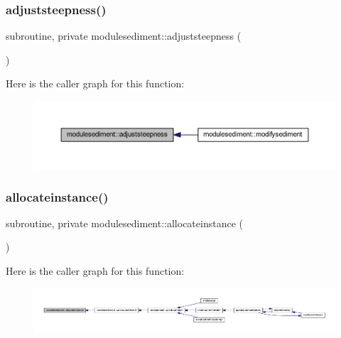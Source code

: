 \subsubsection{\texorpdfstring{adjuststeepness()}{adjuststeepness()}}
{\footnotesize\ttfamily subroutine, private modulesediment\+::adjuststeepness (\begin{DoxyParamCaption}{ }\end{DoxyParamCaption})\hspace{0.3cm}{\ttfamily [private]}}

Here is the caller graph for this function\+:\nopagebreak
\begin{figure}[H]
\begin{center}
\leavevmode
\includegraphics[width=350pt]{namespacemodulesediment_aa82529eb8b689ee3ddf738441376e275_icgraph}
\end{center}
\end{figure}
\mbox{\label{namespacemodulesediment_a7cf40ca051d012f054efecd59d7ffb97}} 
\subsubsection{\texorpdfstring{allocateinstance()}{allocateinstance()}}
{\footnotesize\ttfamily subroutine, private modulesediment\+::allocateinstance (\begin{DoxyParamCaption}{ }\end{DoxyParamCaption})\hspace{0.3cm}{\ttfamily [private]}}

Here is the caller graph for this function\+:\nopagebreak
\begin{figure}[H]
\begin{center}
\leavevmode
\includegraphics[width=350pt]{namespacemodulesediment_a7cf40ca051d012f054efecd59d7ffb97_icgraph}
\end{center}
\end{figure}
\mbox{\label{namespacemodulesediment_a7feb9a14efb0c8cc97dfc870ff9804ce}} 
